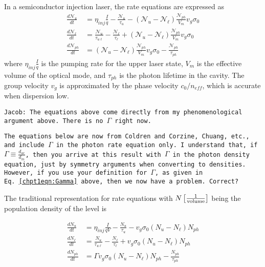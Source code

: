 \documentclass[12pt]{report}
\begin{document}
\noindent
In a semiconductor injection laser, the rate equations are expressed as
\begin{subequations}
\begin{align}
\frac{d \mathcal{N}_u}{dt} &= \eta_{inj}\frac{I}{q} - \frac{\mathcal{N}_u}{\tau_u} - (\mathcal{N}_u - \mathcal{N}_\ell) \frac{\mathcal{N}_{ph}}{V_m} v_g \sigma_0\\
\frac{d \mathcal{N}_\ell}{dt} &= \frac{\mathcal{N}_u}{\tau_{u\ell}} - \frac{\mathcal{N}_\ell}{\tau_\ell} + (\mathcal{N}_u - \mathcal{N}_\ell) \frac{\mathcal{N}_{ph}}{V_m} v_g \sigma_0\\
\frac{d \mathcal{N}_{ph}}{dt} &= (\mathcal{N}_u - \mathcal{N}_\ell) \frac{\mathcal{N}_{ph}}{V_m} v_g \sigma_0 - \frac{\mathcal{N}_{ph}}{\tau_{ph}}
\end{align}
\end{subequations}
where $\eta_{inj}\frac{I}{q}$ is the pumping rate for the upper laser state, $V_m$ is the effective volume of the optical mode, and $\tau_{ph}$ is the photon lifetime in the cavity.  The group velocity $v_g$ is approximated by the phase velocity $c_0/n_{eff}$, which is accurate when dispersion low.

\bigskip
\noindent
\texttt{Jacob: The equations above come directly from my phenomenological argument above.  There is no $\Gamma$ right now.}

\bigskip
\noindent
\texttt{The equations below are now from Coldren and Corzine, Chuang, etc., and include $\Gamma$ in the photon rate equation only.  I understand that, if $\Gamma\equiv\frac{d_{ac}}{d_m}$, then you arrive at this result with $\Gamma$ in the photon density equation, just by symmetry arguments when converting to densities.  However, if you use your definition for $\Gamma$, as given in Eq.~\eqref{chpt1eqn:Gamma} above, then we now have a problem.  Correct? }

\bigskip
\noindent
The traditional representation for rate equations with $N \left[\frac{1}{\textnormal{volume}}\right]$ being the population density of the level is

\begin{subequations}
\begin{align}
\frac{d N_u}{dt}&=\eta_\textit{inj} \frac{I}{q V}-\frac{N_u}{\tau_u}-v_g \sigma_0 (N_u-N_\ell) N_{ph}\\
\frac{d N_\ell}{dt}&=\frac{N_u}{\tau_{u\ell}}-\frac{N_\ell}{\tau_\ell}+v_g \sigma_0 (N_u-N_\ell) N_{ph}\\
\frac{d N_{ph}}{dt}&=\Gamma v_g \sigma_0 (N_u-N_\ell) N_{ph} - \frac{N_{ph}}{\tau_{ph}}
\end{align}
\end{subequations}
\end{document}
